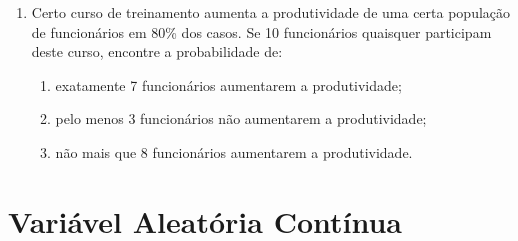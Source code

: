 \begin{enumerate}
\item Certo curso de treinamento aumenta a produtividade de uma certa população de funcionários em 80\% dos casos. Se 10 funcionários quaisquer participam deste curso, encontre a probabilidade de:
	\begin{enumerate}[label=\alph*)]
		\item exatamente 7 funcionários aumentarem a produtividade;
		\item pelo menos 3 funcionários não aumentarem a produtividade;
		\item não mais que 8 funcionários aumentarem a produtividade.
	\end{enumerate}
\end{enumerate}

\newpage
\section*{Variável Aleatória Contínua}
